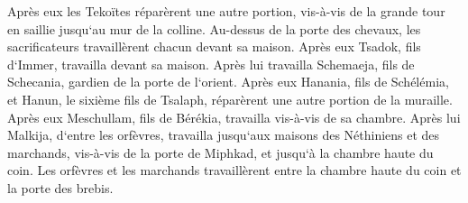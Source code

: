 \verse Après eux les Tekoïtes réparèrent une autre portion, vis-à-vis de la grande tour en saillie jusqu`au mur de la colline. 
\verse Au-dessus de la porte des chevaux, les sacrificateurs travaillèrent chacun devant sa maison. 
\verse Après eux Tsadok, fils d`Immer, travailla devant sa maison. Après lui travailla Schemaeja, fils de Schecania, gardien de la porte de l`orient. 
\verse Après eux Hanania, fils de Schélémia, et Hanun, le sixième fils de Tsalaph, réparèrent une autre portion de la muraille. Après eux Meschullam, fils de Bérékia, travailla vis-à-vis de sa chambre. 
\verse Après lui Malkija, d`entre les orfèvres, travailla jusqu`aux maisons des Néthiniens et des marchands, vis-à-vis de la porte de Miphkad, et jusqu`à la chambre haute du coin. 
\verse Les orfèvres et les marchands travaillèrent entre la chambre haute du coin et la porte des brebis. 

